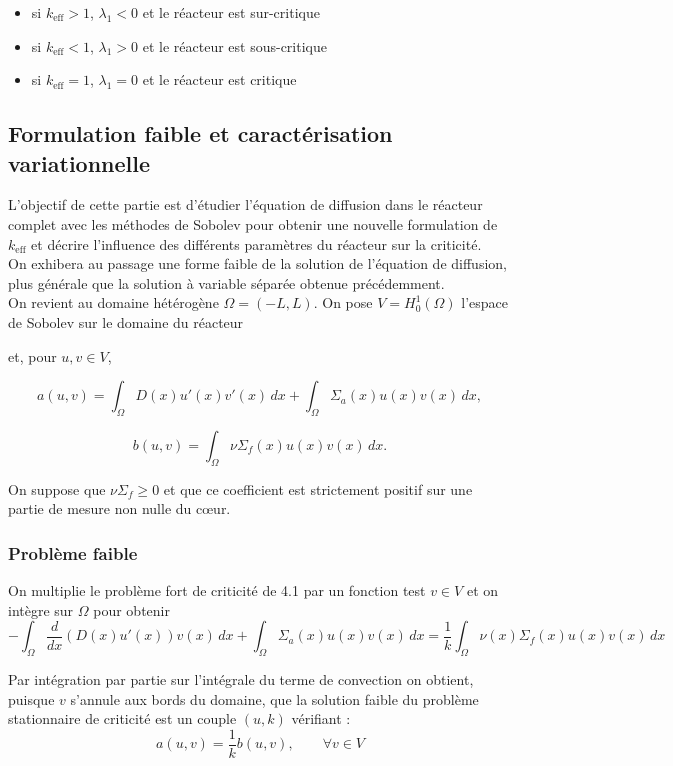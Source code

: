 \documentclass{article}
\newcommand{\keff}{k_{\mathrm{eff}}}
\begin{document}
\begin{itemize}
    \item si $\keff > 1$, $\lambda_1 < 0$ et le réacteur est sur-critique
    \item si $\keff < 1$, $\lambda_1 > 0$ et le réacteur est sous-critique
    \item si $\keff = 1$, $\lambda_1 = 0$ et le réacteur est critique
\end{itemize}

\subsection{Formulation faible et caractérisation variationnelle}
L'objectif de cette partie est d'étudier l'équation de diffusion dans le réacteur complet avec les méthodes de Sobolev pour obtenir une nouvelle formulation de $\keff$ et décrire l'influence des différents paramètres du réacteur sur la criticité.\\
On exhibera au passage une forme faible de la solution de l'équation de diffusion, plus générale que la solution à variable séparée obtenue précédemment.\\
On revient au domaine hétérogène $\Omega=(-L,L)$. On pose  $V=H_0^1(\Omega)$ l'espace de Sobolev sur le domaine du réacteur 

et, pour $u,v\in V$,

\[
a(u,v)=\int_\Omega D(x)u'(x)v'(x)\,dx
+\int_\Omega \Sigma_a(x)u(x)v(x)\,dx,
\]

\[
b(u,v)=\int_\Omega \nu\Sigma_f(x)u(x)v(x)\,dx.
\]

On suppose que $\nu\Sigma_f\geq0$ et que ce coefficient est strictement positif
sur une partie de mesure non nulle du cœur.

\subsubsection{Problème faible}

On multiplie le problème fort de criticité de 4.1 par un fonction test $v\in V$ et on intègre sur $\Omega$ pour obtenir 
\begin{equation}
    -\int_{\Omega}\dfrac{d}{dx}(D(x)u'(x))v(x)\,dx + \int_{\Omega}\Sigma_a(x)u(x)v(x)\,dx = \frac{1}{k}\int_{\Omega}\nu(x)\Sigma_f(x)u(x)v(x)\,dx
\end{equation}

Par intégration par partie sur l'intégrale du terme de convection on obtient, puisque $v$ s'annule aux bords du domaine, que la solution faible du problème stationnaire de criticité est un couple $(u,k)$ vérifiant :
\begin{equation}
    a(u,v) = \frac1k b(u,v), \qquad \forall v\in V
\end{equation}
\end{document}
